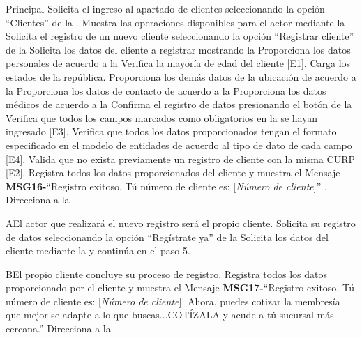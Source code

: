 	\begin{UCtrayectoria}{Principal}
		\UCpaso[\UCactor] Solicita el ingreso al apartado de clientes seleccionando la opción ``Clientes'' de la  .
		\UCpaso Muestra las operaciones disponibles para el actor mediante la 
		\UCpaso[\UCactor] Solicita el registro de un nuevo cliente seleccionando la opción ``Registrar cliente'' de la 
		\UCpaso Solicita los datos del cliente a registrar mostrando la 
		\UCpaso[\UCactor] Proporciona los datos personales de acuerdo a la 
		\UCpaso Verifica la mayoría de edad del cliente [E1].
		\UCpaso Carga los estados de la república.
		\UCpaso[\UCactor] Proporciona los demás datos de la ubicación de acuerdo a la 
		\UCpaso[\UCactor] Proporciona los datos de contacto de acuerdo a la 
		\UCpaso[\UCactor] Proporciona los datos médicos de acuerdo a la 
		\UCpaso[\UCactor] Confirma el registro de datos presionando el botón  de la 
		\UCpaso Verifica que todos los campos marcados como obligatorios en la  se hayan ingresado [E3].
		\UCpaso Verifica que todos los datos proporcionados tengan el formato especificado en el modelo de entidades de acuerdo al tipo de dato de cada campo [E4].
		\UCpaso Valida que no exista previamente un registro de cliente con la misma CURP [E2].
		\UCpaso Registra todos los datos proporcionados del cliente y muestra el Mensaje {\bf MSG16-}``Registro exitoso. Tú número de cliente es: [{\em Número de cliente}]'' .
		\UCpaso Direcciona a la 
\end{UCtrayectoria}

\begin{UCtrayectoriaA}{A}{El actor que realizará el nuevo registro será el propio cliente.}
			\UCpaso[\UCactor] Solicita su registro de datos seleccionando la opción ``Regístrate ya'' de la 
			\UCpaso Solicita los datos del cliente mediante la  y continúa en el paso 5.		
		\end{UCtrayectoriaA}
		
		\begin{UCtrayectoriaA}{B}{El propio cliente concluye su proceso de registro.}
			\UCpaso Registra todos los datos proporcionado por el cliente y muestra el Mensaje {\bf MSG17-}``Registro exitoso. Tú número de cliente es: [{\em Número de cliente}]. Ahora, puedes cotizar la membresía que mejor se adapte a lo que buscas...COTÍZALA y acude a tú sucursal más cercana.'' 
			\UCpaso Direcciona a la 
		\end{UCtrayectoriaA}


			
